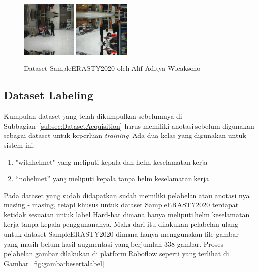 \begin{enumerate}
  \begin{figure}[ht]
    \centering
    \includegraphics[width=0.24\textwidth]{gambar/sample_erasty/APB-Hat-6-_jpg.rf.79aa17f23c1834efa681edc7aca5cd5f.jpg}
    \includegraphics[width=0.24\textwidth]{gambar/sample_erasty/APB-Hat-7-_jpg.rf.4e9ff94579f598546de38a9b5c88a05d.jpg}
    \caption{Dataset SampleERASTY2020 oleh Alif Aditya Wicaksono}
    \label{fig:dataseterastypreview}  
  \end{figure}

\end{enumerate}

\subsection{Dataset Labeling}
\label{subsec:dataset_labeling}

\par Kumpulan dataset yang telah dikumpulkan sebelumnya di Subbagian~\ref{subsec:DatasetAcquisition} harus memiliki anotasi sebelum digunakan sebagai dataset untuk keperluan \emph{training}. Ada dua kelas yang digunakan untuk sistem ini:

\begin{enumerate}[nolistsep]
  \item "with\textunderscore helmet" yang meliputi kepala dan helm keselamatan kerja
  \item “no\textunderscore helmet” yang meliputi kepala tanpa helm keselamatan kerja
\end{enumerate}

Pada dataset yang sudah didapatkan sudah memiliki pelabelan atau anotasi nya masing - masing, tetapi khusus untuk dataset SampleERASTY2020 terdapat ketidak sesuaian untuk label Hard-hat dimana hanya meliputi helm keselamatan kerja tanpa kepala penggunananya. Maka dari itu  dilakukan pelabelan ulang untuk dataset SampleERASTY2020 dimana hanya menggunakan file gambar yang masih belum hasil augmentasi yang berjumlah 338 gambar. Proses pelabelan gambar dilakukan di platform Roboflow seperti yang terlihat di Gambar~\ref{fig:gambarbesertalabel}

